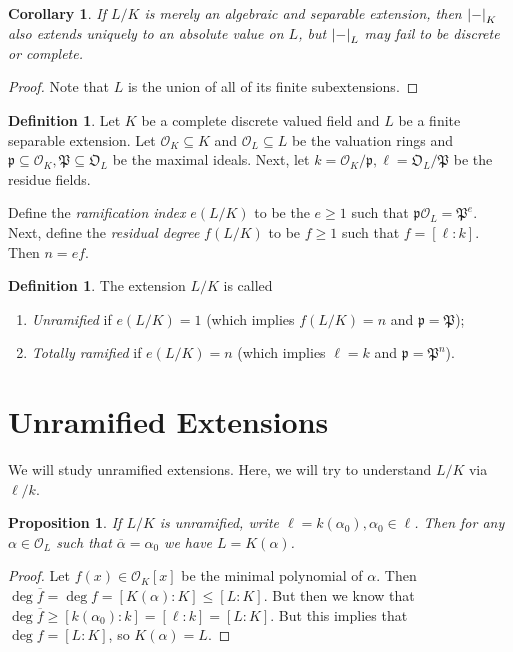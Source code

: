 \documentclass[leqno, openany]{memoir}
\newtheorem{cor}[thm]{Corollary}
\newtheorem{prop}[thm]{Proposition}
\theoremstyle{definition}
\newtheorem{defn}[thm]{Definition}
\theoremstyle{remark}
\theoremstyle{plain}
\theoremstyle{definition}
\theoremstyle{remark}
\newcommand{\mc}[1]{\mathcal{#1}}
\newcommand{\mf}[1]{\mathfrak{#1}}
\newcommand{\ol}[1]{\overline{#1}}
\begin{document}
\begin{cor}
    If $L/K$ is merely an algebraic and separable extension, then $\abs{-}_K$ also extends uniquely to an absolute value on $L$, but $\abs{-}_L$ may fail to be discrete or complete.
\end{cor}

\begin{proof}
    Note that $L$ is the union of all of its finite subextensions.
\end{proof}

\begin{defn}
    Let $K$ be a complete discrete valued field and $L$ be a finite separable extension. Let $\mc{O}_K \subseteq K$ and $\mc{O}_L \subseteq L$ be the valuation rings and $\mf{p} \subseteq \mc{O}_K, \mf{P} \subseteq \mf{O}_L$ be the maximal ideals. Next, let $k = \mc{O}_K/\mf{p}, \ell = \mf{O}_L / \mf{P}$ be the residue fields. 

    Define the \textit{ramification index} $e(L/K)$ to be the $e \geq 1$ such that $\mf{p} \mc{O}_L = \mf{P}^e$. Next, define the \textit{residual degree} $f(L/K)$ to be $f \geq 1$ such that $f = [\ell : k]$. Then $n = ef$.  
\end{defn}

\begin{defn}
    The extension $L/K$ is called
    \begin{enumerate}
        \item \textit{Unramified} if $e(L/K) = 1$ (which implies $f(L/K) = n$ and $\mf{p} = \mf{P}$);
        \item \textit{Totally ramified} if $e(L/K) = n$ (which implies $\ell = k$ and $\mf{p} = \mf{P}^n$).
    \end{enumerate}
\end{defn}

\section{Unramified Extensions}%
\label{sec:unramified_extensions}

We will study unramified extensions. Here, we will try to understand $L/K$ via $\ell / k$.

\begin{prop}
    If $L/K$ is unramified, write $\ell = k(\alpha_0), \alpha_0 \in \ell$. Then for any $\alpha \in \mc{O}_L$ such that $\ol{\alpha} = \alpha_0$ we have $L = K(\alpha)$.
\end{prop}

\begin{proof}
    Let $f(x) \in \mc{O}_K[x]$ be the minimal polynomial of $\alpha$. Then $\deg \ol{f} = \deg f = [K(\alpha) : K] \leq [L:K]$. But then we know that $\deg \ol{f} \geq [k(\alpha_0) : k] = [\ell : k] = [L:K]$. But this implies that $\deg f = [L:K]$, so $K(\alpha) = L$.
\end{proof}
\end{document}
